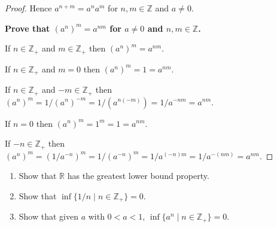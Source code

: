 \begin{proof}
    Hence $a^{n+m} = a^{n}a^{m}$ for $n,m\in\mathbb{Z}$ and $a\ne 0$.

    \bigskip
    \textbf{Prove that ${(a^{n})}^{m} = a^{nm}$ for $a\ne 0$ and $n, m\in\mathbb{Z}$.}

    If $n\in\mathbb{Z}_{+}$ and $m\in\mathbb{Z}_{+}$ then ${(a^{n})}^{m} = a^{nm}$.

    If $n\in\mathbb{Z}_{+}$ and $m = 0$ then ${(a^{n})}^{m} = 1 = a^{nm}$.

    If $n\in\mathbb{Z}_{+}$ and $-m\in\mathbb{Z}_{+}$ then ${(a^{n})}^{m} = 1/{(a^{n})}^{-m} = 1/{(a^{n(-m)})} = 1/a^{-nm} = a^{nm}$.

    If $n = 0$ then ${(a^{n})}^{m} = 1^{m} = 1 = a^{nm}$.

    If $-n\in\mathbb{Z}_{+}$ then ${(a^{n})}^{m} = {(1/a^{-n})}^{m} = 1/{(a^{-n})}^{m} = 1/{a^{(-n)m}} = 1/{a^{-(nm)}} = a^{nm}$.
\end{proof}

\begin{exercise}\label{chapter1:section4:exercise8}
    \begin{enumerate}[label={(\alph*)}]
        \item Show that $\mathbb{R}$ has the greatest lower bound property.
        \item Show that $\inf\{ 1/n \mid n\in\mathbb{Z}_{+} \} = 0$.
        \item Show that given $a$ with $0 < a < 1$, $\inf\{ a^{n} \mid n\in\mathbb{Z}_{+} \} = 0$.
    \end{enumerate}
\end{exercise}


